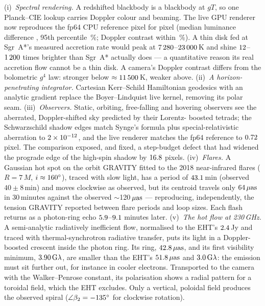 (i)~\emph{Spectral rendering.} A redshifted blackbody is a blackbody at
$gT$, so one Planck--CIE lookup carries Doppler colour and beaming. The live
GPU renderer now reproduces the fp64 CPU reference pixel for pixel (median
luminance difference \XLiveDlnYMed, 95th percentile \XLiveDlnYPninetyfive\,\%;
Doppler contrast within \XLiveBeamErr\,\%). A thin disk fed at Sgr~A*'s
measured accretion rate would peak at $7\,280$--$23\,000$\,K and shine
$12$--$1\,200$ times brighter than Sgr~A* actually does
--- a quantitative reason its real accretion flow cannot be a thin disk. A
camera's Doppler contrast differs from the bolometric $g^4$ law: stronger
below $\approx11\,500$\,K, weaker above.
(ii)~\emph{A horizon-penetrating integrator.} Cartesian Kerr--Schild
Hamiltonian geodesics with an analytic gradient replace the Boyer--Lindquist
live kernel, removing its polar seam.
(iii)~\emph{Observers.} Static, orbiting, free-falling and hovering
observers see the aberrated, Doppler-shifted sky predicted by their Lorentz-
boosted tetrads; the Schwarzschild shadow edges match Synge's formula plus
special-relativistic aberration to $2\times10^{-12}$, and the live renderer
matches the fp64 reference to $0.72$ pixel. The comparison exposed,
and fixed, a step-budget defect that had widened the prograde edge of the
high-spin shadow by $16.8$ pixels.
(iv)~\emph{Flares.} A Gaussian hot spot on the orbit GRAVITY fitted to the
2018 near-infrared flares ($R = 7\,M$, $i \approx 160^\circ$), traced with
slow light, has a period of $43.1$\,min (observed $40\pm8$\,min) and
moves clockwise as observed, but its centroid travels only $64\,\mu\mathrm{as}$
in 30\,minutes against the observed $\sim$120\,$\mu\mathrm{as}$ --- reproducing,
independently, the tension GRAVITY reported between flare periods and loop
sizes. Each flash returns as a photon-ring echo $5.9$--$9.1$
minutes later.
(v)~\emph{The hot flow at 230\,GHz.} A semi-analytic radiatively
inefficient flow, normalised to the EHT's $2.4$\,Jy and traced with
thermal-synchrotron radiative transfer, puts its light in a Doppler-boosted
crescent inside the photon ring. Its ring, $42.8\,\mu\mathrm{as}$, and its
first visibility minimum, $3.90\,{\rm G}\lambda$, are smaller than
the EHT's $51.8\,\mu\mathrm{as}$ and $3.0\,{\rm G}\lambda$: the emission must sit
further out, for instance in cooler electrons. Transported to the camera
with the Walker--Penrose constant, its polarisation shows a radial pattern
for a toroidal field, which the EHT excludes. Only a vertical, poloidal field
produces the observed spiral ($\angle\beta_2 = -135^\circ$ for
clockwise rotation).

